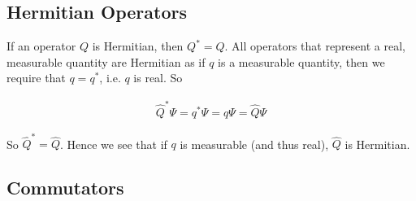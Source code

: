 \subsection{Hermitian Operators}

If an operator $Q$ is Hermitian, then $Q^* = Q$. All operators that represent a real, measurable quantity are Hermitian as if $q$ is a measurable quantity, then we require that $q = q^*$, i.e. $q$ is real. So

\begin{align*}
\hat{Q}^*\Psi = q^*\Psi = q\Psi = \hat{Q}\Psi
\end{align*}

So $\hat{Q}^* = \hat{Q}$. Hence we see that if $q$ is measurable (and thus real), $\hat{Q}$ is Hermitian.


\subsection{Commutators}
